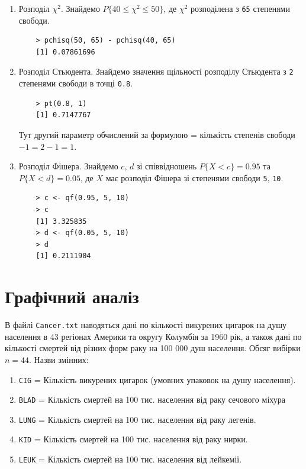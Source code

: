 \documentclass[a4paper, 12pt]{article}
\begin{document}
\begin{enumerate}
	\item Розподіл $\chi^2$. Знайдемо $P \{ 40 \le \chi^2 \le 50 \}$, де $\chi^2$ розподілена з \verb|65| степенями свободи.
	\begin{verbatim}
	> pchisq(50, 65) - pchisq(40, 65)
	[1] 0.07861696
	\end{verbatim}

	\item Розподіл Стьюдента. Знайдемо значення щільності розподілу Стьюдента з \verb|2| степенями свободи в точці \verb|0.8|.
	\begin{verbatim}
	> pt(0.8, 1)
	[1] 0.7147767
	\end{verbatim}
	Тут другий параметр обчислений за формулою = кількість степенів свободи $-1 = 2 - 1 = 1$.

	\item Розподіл Фішера. Знайдемо $c$, $d$ зі співвідношень $P\{ X < c\} = 0.95$ та $P \{ X < d\} = 0.05$, де $X$ має розподіл Фішера зі степенями свободи \verb|5|, \verb|10|.
	\begin{verbatim}
	> c <- qf(0.95, 5, 10)
	> c
	[1] 3.325835
	> d <- qf(0.05, 5, 10)
	> d
	[1] 0.2111904
	\end{verbatim}
\end{enumerate}

\section{Графічний аналіз}

В файлі \verb|Cancer.txt| наводяться дані по кількості викурених цигарок на душу населення в 43 регіонах Америки та округу Колумбія за 1960 рік, а також дані по кількості смертей від різних форм раку на 100 000 душ населення. Обсяг вибірки $n = 44$. Назви змінних:

\begin{enumerate}
	\item \verb|CIG| = Кількість викурених цигарок (умовних упаковок на душу населення).
	\item \verb|BLAD| = Кількість смертей на 100 тис. населення від раку сечового міхура
	\item \verb|LUNG| = Кількість смертей на 100 тис. населення від раку легенів.
	\item \verb|KID| = Кількість смертей на 100 тис. населення від раку нирки.
	\item \verb|LEUK| = Кількість смертей на 100 тис. населення від лейкемії.
\end{enumerate}
\end{document}
